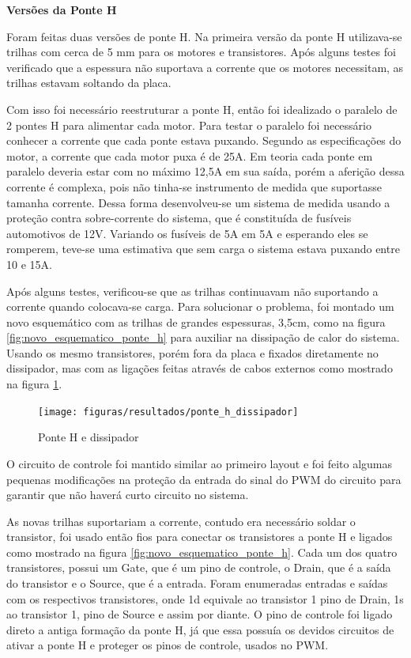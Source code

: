 			\textbf{Versões da Ponte H}

			Foram feitas duas versões de ponte H. Na primeira versão da ponte H utilizava-se trilhas com cerca de 5 mm para os motores e transistores. Após alguns testes foi verificado que a espessura não suportava a corrente que os motores necessitam, as trilhas estavam soltando da placa.

			Com isso foi necessário reestruturar a ponte H, então foi idealizado o paralelo de 2 pontes H para alimentar cada motor. Para testar o paralelo foi necessário conhecer a corrente que cada ponte estava puxando. Segundo as especificações do motor, a corrente que cada motor puxa é de 25A. Em teoria cada ponte em paralelo deveria estar com no máximo 12,5A em sua saída, porém a aferição dessa corrente é complexa, pois não tinha-se instrumento de medida que suportasse tamanha corrente. Dessa forma desenvolveu-se um sistema de medida usando a proteção contra sobre-corrente do sistema, que é constituída de fusíveis automotivos de 12V. Variando os fusíveis de 5A em 5A e esperando eles se romperem, teve-se uma estimativa que sem carga o sistema estava puxando entre 10 e 15A.

			Após alguns testes, verificou-se que as trilhas continuavam não suportando a corrente quando colocava-se carga. Para solucionar o problema, foi montado um novo esquemático com as trilhas de grandes espessuras, 3,5cm, como na figura \ref{fig:novo_esquematico_ponte_h} para auxiliar na dissipação de calor do sistema. Usando os mesmo transistores, porém fora da placa e fixados diretamente no dissipador, mas com as ligações feitas através de cabos externos como mostrado na figura \ref{fig:ponte_h_dissipador}.

			\begin{figure}[!ht]
				\center
				\texttt{[image: figuras/resultados/ponte\_h\_dissipador]}
				\caption{Ponte H e dissipador}
				\label{fig:ponte_h_dissipador}
			\end{figure}

			O circuito de controle foi mantido similar ao primeiro layout e foi feito algumas pequenas modificações na proteção da entrada do sinal do PWM do circuito para garantir que não haverá curto circuito no sistema.

			As novas trilhas suportariam a corrente, contudo era necessário soldar o transistor, foi usado então fios para conectar os transistores a ponte H e ligados como mostrado na figura \ref{fig:novo_esquematico_ponte_h}. Cada um dos quatro transistores, possui um Gate, que é um pino de controle, o Drain, que é a saída do transistor e o Source, que é a entrada. Foram enumeradas entradas e saídas com os respectivos transistores, onde 1d equivale ao transistor 1 pino de Drain, 1s ao transistor 1, pino de Source e assim por diante. O pino de controle foi ligado direto a antiga formação da ponte H, já que essa possuía os devidos circuitos de ativar a ponte H e proteger os pinos de controle, usados no PWM.

